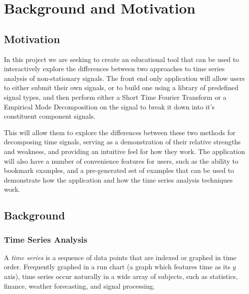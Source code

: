 \documentclass[
  paper=a4,
  ,captions=tableheading
]{scrartcl}
\author{}
\date{}
\title{}
\author{}
\date{}
\begin{document}


\tableofcontents
\newpage

\hypertarget{background-and-motivation}{%
\section{Background and Motivation}\label{background-and-motivation}}

\hypertarget{motivation}{%
\subsection{Motivation}\label{motivation}}

In this project we are seeking to create an educational tool that can be
used to interactively explore the differences between two approaches to
time series analysis of non-stationary signals. The front end only
application will allow users to either submit their own signals, or to
build one using a library of predefined signal types, and then perform
either a Short Time Fourier Transform or a Empirical Mode Decomposition
on the signal to break it down into it's constituent component signals.

This will allow them to explore the differences between these two
methods for decomposing time signals, serving as a demonstration of
their relative strengths and weakness, and providing an intuitive feel
for how they work. The application will also have a number of
convenience features for users, such as the ability to bookmark
examples, and a pre-generated set of examples that can be used to
demonstrate how the application and how the time series analysis
techniques work.

\hypertarget{background}{%
\subsection{Background}\label{background}}

\hypertarget{time-series-analysis}{%
\subsubsection{Time Series Analysis}\label{time-series-analysis}}

A \emph{time series} is a sequence of data points that are indexed or
graphed in time order. Frequently graphed in a run chart (a graph which
features time as its \(y\) axis), time series occur naturally in a
wide array of subjects, such as statistics, finance, weather
forecasting, and signal processing.
\end{document}
